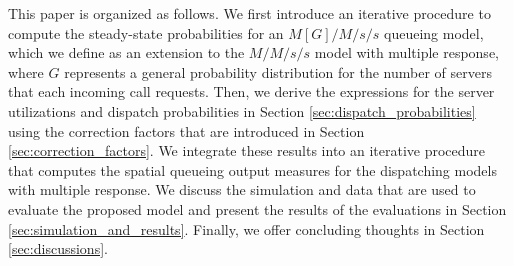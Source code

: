 \documentclass[11pt]{article}\topmargin 0mm
\begin{document}
This paper is organized as follows.
We first introduce an iterative procedure to compute the
steady-state probabilities for an $M[G]/M/s/s$ queueing model,
which we define as an extension to the $M/M/s/s$ model with
multiple response, where $G$ represents a general probability
distribution for the number of servers that each incoming call
requests. Then, we derive the expressions for the server
utilizations and dispatch probabilities in Section
\ref{sec:dispatch_probabilities} using the correction factors
that are introduced in Section \ref{sec:correction_factors}. We
integrate these results into an iterative procedure that
computes the spatial queueing output measures for the dispatching
models with multiple response. We discuss the simulation and
data that are used to evaluate the proposed model and present
the results of the evaluations in Section
\ref{sec:simulation_and_results}. Finally, we offer concluding
thoughts in Section \ref{sec:discussions}.




\end{document}
